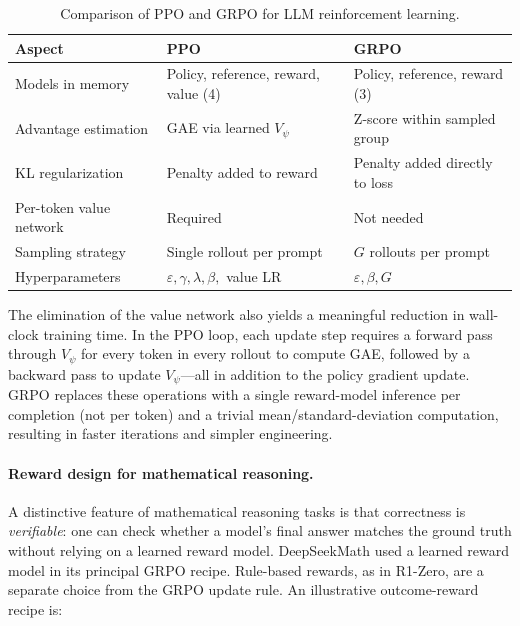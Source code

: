 \begin{table}[t]
\centering
\caption{Comparison of PPO and GRPO for LLM reinforcement learning.}
\label{tab:ppo-vs-grpo}
\small
\begin{tabular}{@{}p{}p{}p{}@{}}
\toprule
\textbf{Aspect} & \textbf{PPO} & \textbf{GRPO} \\
\midrule
Models in memory &
  Policy, reference, reward, value (4) &
  Policy, reference, reward (3) \\
Advantage estimation &
  GAE via learned $V_\psi$ &
  Z-score within sampled group \\
KL regularization &
  Penalty added to reward &
  Penalty added directly to loss \\
Per-token value network &
  Required &
  Not needed \\
Sampling strategy &
  Single rollout per prompt &
  $G$ rollouts per prompt \\
Hyperparameters &
  $\varepsilon, \gamma, \lambda, \beta,$ value LR &
  $\varepsilon, \beta, G$ \\
\bottomrule
\end{tabular}
\end{table}

The elimination of the value network also yields a meaningful reduction in
wall-clock training time.  In the PPO loop, each update step requires a
forward pass through $V_\psi$ for every token in every rollout to compute
GAE, followed by a backward pass to update $V_\psi$---all in addition to
the policy gradient update.  GRPO replaces these operations with a single
reward-model inference per completion (not per token) and a trivial
mean/standard-deviation computation, resulting in faster iterations and
simpler engineering.

\paragraph{Reward design for mathematical reasoning.}
A distinctive feature of mathematical reasoning tasks is that correctness
is \emph{verifiable}: one can check whether a model's final answer matches
the ground truth without relying on a learned reward model.
DeepSeekMath\cite{shao2024deepseekmath} used a learned reward model in its principal GRPO recipe. Rule-based rewards, as in R1-Zero, are a separate choice from the GRPO update rule. An illustrative outcome-reward recipe is:


